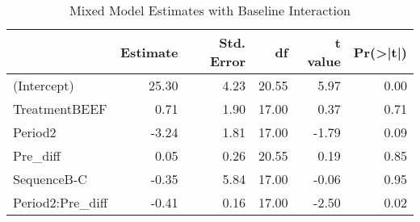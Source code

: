 \begin{table}

\caption{\label{tab:proteinDataEstimates}Mixed Model Estimates with Baseline Interaction}
\centering
\begin{tabular}[t]{>{}l|rrrrr}
\toprule
  & Estimate & Std. Error & df & t value & Pr(>|t|)\\
\midrule
(Intercept) & 25.30 & 4.23 & 20.55 & 5.97 & 0.00\\
TreatmentBEEF & 0.71 & 1.90 & 17.00 & 0.37 & 0.71\\
Period2 & -3.24 & 1.81 & 17.00 & -1.79 & 0.09\\
Pre\_diff & 0.05 & 0.26 & 20.55 & 0.19 & 0.85\\
SequenceB-C & -0.35 & 5.84 & 17.00 & -0.06 & 0.95\\
\addlinespace
Period2:Pre\_diff & -0.41 & 0.16 & 17.00 & -2.50 & 0.02\\
\bottomrule
\end{tabular}
\end{table}
